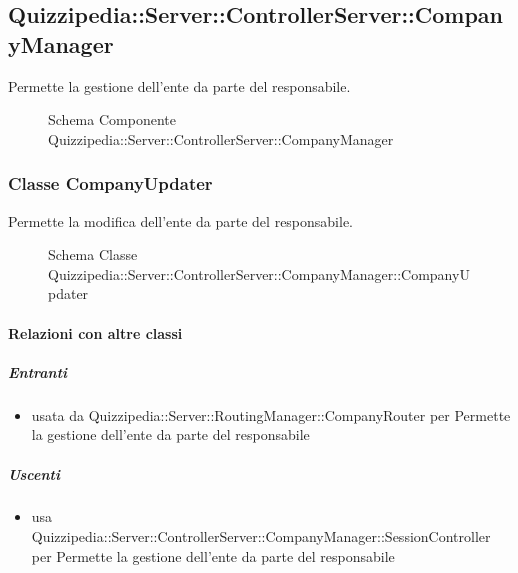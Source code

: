 \subsection{Quizzipedia::Server::ControllerServer::CompanyManager}
Permette la gestione dell'ente da parte del responsabile.
\begin{figure}[H]
\centering
\noindent{}
\caption[Schema Componente Quizzipedia::Server::ControllerServer::CompanyManager]{Schema Componente Quizzipedia::Server::ControllerServer::CompanyManager}
\end{figure}
\subsubsection{Classe CompanyUpdater}
Permette la modifica dell'ente da parte del responsabile.
\begin{figure}[H]
\centering
\noindent{}
\caption[Schema Classe CompanyUpdater]{Schema Classe Quizzipedia::Server::ControllerServer::CompanyManager::CompanyUpdater}
\end{figure}
\paragraph{Relazioni con altre classi}
\subparagraph{Entranti}
\begin{itemize}
\item usata da Quizzipedia::Server::RoutingManager::CompanyRouter per Permette la gestione dell'ente da parte del responsabile
\end{itemize}
\subparagraph{Uscenti}
\begin{itemize}
\item usa Quizzipedia::Server::ControllerServer::CompanyManager::SessionController per Permette la gestione dell'ente da parte del responsabile
\end{itemize}
